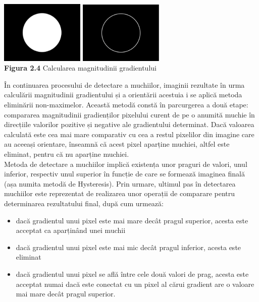 \documentclass[a4paper,12pt]{report}
\newcommand\tab[1][1cm]{\hspace*{#1}}
\begin{document}
\begin {center} 
	\begin {footnotesize} 
		\includegraphics[width = 40mm]{fig2_4_1}
		\includegraphics[width = 40mm]{fig2_4_2} \\
		\textbf  {Figura 2.4} Calcularea magnitudinii gradientului
	\end {footnotesize} 
\end {center}
\tab În continuarea procesului de detectare a muchiilor, imaginii rezultate în urma calculării magnitudinii gradientului și a orientării acestuia i se aplică metoda eliminării non-maximelor. Această metodă constă 
în parcurgerea a două etape: compararea magnitudinii gradienților pixelului curent de pe o anumită muchie în direcțiile valorilor pozitive și negative ale gradientului determinat. Dacă valoarea calculată este cea mai mare comparativ cu cea a restul pixelilor din imagine care au aceeași orientare, înseamnă că acest pixel aparține muchiei, altfel este eliminat, pentru că nu aparține muchiei. 
\\ \tab Metoda de detectare a muchiilor implică existența unor praguri de valori, unul inferior, respectiv unul superior în funcție de care se formează imaginea finală (așa numita metodă de Hysteresis). Prin urmare, ultimul pas în detectarea muchiilor este
reprezentat de realizarea unor operații de comparare pentru determinarea rezultatului final, după cum urmează:
\begin{itemize}
\setlength\itemsep{1pt}
\item dacă gradientul unui pixel este mai mare decât pragul superior, acesta este acceptat ca aparținând unei muchii
\item dacă gradientul unui pixel este mai mic decât pragul inferior, acesta este eliminat
\item dacă gradientul unui pixel se află între cele două valori de prag, acesta este acceptat numai dacă este conectat cu un pixel al cărui gradient are o valoare mai mare decât pragul superior.
\end{itemize}
\end{document}
